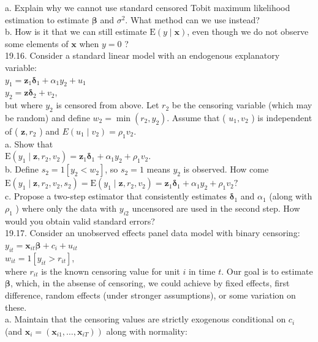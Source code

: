 \documentclass[10pt]{article}
\begin{document}
a. Explain why we cannot use standard censored Tobit maximum likelihood estimation to estimate $\boldsymbol{\beta}$ and $\sigma^{2}$. What method can we use instead?\\
b. How is it that we can still estimate $\mathrm{E}(y \mid \mathbf{x})$, even though we do not observe some elements of $\mathbf{x}$ when $y=0$ ?\\
19.16. Consider a standard linear model with an endogenous explanatory variable:\\
$y_{1}=\mathbf{z}_{1} \boldsymbol{\delta}_{1}+\alpha_{1} y_{2}+u_{1}$\\
$y_{2}=\mathbf{z} \boldsymbol{\delta}_{2}+v_{2}$,\\
but where $y_{2}$ is censored from above. Let $r_{2}$ be the censoring variable (which may be random) and define $w_{2}=\min \left(r_{2}, y_{2}\right)$. Assume that ( $u_{1}, v_{2}$ ) is independent of ( $\mathbf{z}, r_{2}$ ) and $E\left(u_{1} \mid v_{2}\right)=\rho_{1} v_{2}$.\\
a. Show that\\
$\mathrm{E}\left(y_{1} \mid \mathbf{z}, r_{2}, v_{2}\right)=\mathbf{z}_{1} \boldsymbol{\delta}_{1}+\alpha_{1} y_{2}+\rho_{1} v_{2}$.\\
b. Define $s_{2}=1\left[y_{2}<w_{2}\right]$, so $s_{2}=1$ means $y_{2}$ is observed. How come\\
$\mathrm{E}\left(y_{1} \mid \mathbf{z}, r_{2}, v_{2}, s_{2}\right)=\mathrm{E}\left(y_{1} \mid \mathbf{z}, r_{2}, v_{2}\right)=\mathbf{z}_{1} \boldsymbol{\delta}_{1}+\alpha_{1} y_{2}+\rho_{1} v_{2} ?$\\
c. Propose a two-step estimator that consistently estimates $\boldsymbol{\delta}_{1}$ and $\alpha_{1}$ (along with $\rho_{1}$ ) where only the data with $y_{i 2}$ uncensored are used in the second step. How would you obtain valid standard errors?\\
19.17. Consider an unobserved effects panel data model with binary censoring:\\
$y_{i t}=\mathbf{x}_{i t} \boldsymbol{\beta}+c_{i}+u_{i t}$\\
$w_{i t}=1\left[y_{i t}>r_{i t}\right]$,\\
where $r_{i t}$ is the known censoring value for unit $i$ in time $t$. Our goal is to estimate $\boldsymbol{\beta}$, which, in the absense of censoring, we could achieve by fixed effects, first difference, random effects (under stronger assumptions), or some variation on these.\\
a. Maintain that the censoring values are strictly exogenous conditional on $c_{i}$ (and $\left.\mathbf{x}_{i}=\left(\mathbf{x}_{i 1}, \ldots, \mathbf{x}_{i T}\right)\right)$ along with normality:\\
\end{document}
